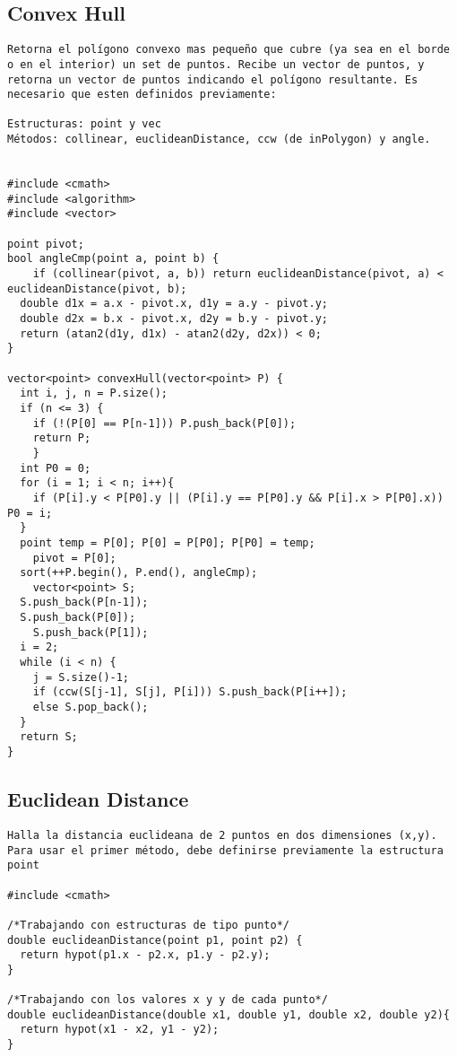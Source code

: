 \documentclass[10pt,letterpaper,twocolumn,twosided]{article}
\begin{document}
\subsection{Convex Hull}
\begin{lstlisting}
Retorna el polígono convexo mas pequeño que cubre (ya sea en el borde o en el interior) un set de puntos. Recibe un vector de puntos, y retorna un vector de puntos indicando el polígono resultante. Es necesario que esten definidos previamente: 

Estructuras: point y vec
Métodos: collinear, euclideanDistance, ccw (de inPolygon) y angle.


#include <cmath>
#include <algorithm>
#include <vector>

point pivot;
bool angleCmp(point a, point b) {                
	if (collinear(pivot, a, b)) return euclideanDistance(pivot, a) < euclideanDistance(pivot, b);
  double d1x = a.x - pivot.x, d1y = a.y - pivot.y;
  double d2x = b.x - pivot.x, d2y = b.y - pivot.y;
  return (atan2(d1y, d1x) - atan2(d2y, d2x)) < 0; 
}

vector<point> convexHull(vector<point> P) {  
  int i, j, n = P.size();
  if (n <= 3) {
  	if (!(P[0] == P[n-1])) P.push_back(P[0]);  
  	return P;
	}
  int P0 = 0;
  for (i = 1; i < n; i++){
  	if (P[i].y < P[P0].y || (P[i].y == P[P0].y && P[i].x > P[P0].x)) P0 = i;
  }
  point temp = P[0]; P[0] = P[P0]; P[P0] = temp; 
	pivot = P[0];
  sort(++P.begin(), P.end(), angleCmp);     
	vector<point> S;
  S.push_back(P[n-1]); 
  S.push_back(P[0]); 
	S.push_back(P[1]);   
  i = 2;                                         
  while (i < n) {           
  	j = S.size()-1;
    if (ccw(S[j-1], S[j], P[i])) S.push_back(P[i++]);
    else S.pop_back();
  }  
  return S; 
}  \end{lstlisting}

\subsection{Euclidean Distance}
\begin{lstlisting}
Halla la distancia euclideana de 2 puntos en dos dimensiones (x,y). Para usar el primer método, debe definirse previamente la estructura point

#include <cmath>

/*Trabajando con estructuras de tipo punto*/
double euclideanDistance(point p1, point p2) {           
  return hypot(p1.x - p2.x, p1.y - p2.y); 
} 

/*Trabajando con los valores x y y de cada punto*/
double euclideanDistance(double x1, double y1, double x2, double y2){           
  return hypot(x1 - x2, y1 - y2); 
} 
\end{lstlisting}
\end{document}
